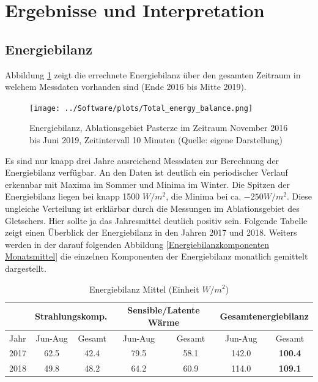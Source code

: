\documentclass[11pt,a4paper]{article}
\begin{document}
\pagebreak
\section{Ergebnisse und Interpretation}
\subsection{Energiebilanz}
Abbildung \ref{fig:Energiebilanz gesamter Messzeitraum, Zeitintervall 10 Minuten} zeigt die errechnete Energiebilanz über den gesamten Zeitraum in welchem Messdaten vorhanden sind (Ende 2016 bis Mitte 2019). 

\begin{figure}[H]
\centering
\texttt{[image: ../Software/plots/Total\_energy\_balance.png]}
\caption[Energiebilanz, Ablationsgebiet Pasterze im Zeitraum November 2016 bis Juni 2019, Zeitintervall 10 Minuten]{Energiebilanz, Ablationsgebiet Pasterze im Zeitraum November 2016 bis Juni 2019, Zeitintervall 10 Minuten (Quelle: eigene Darstellung)}
\label{fig:Energiebilanz gesamter Messzeitraum, Zeitintervall 10 Minuten}
\end{figure}

Es sind nur knapp drei Jahre ausreichend Messdaten zur Berechnung der Energiebilanz verfügbar. An den Daten ist deutlich ein periodischer Verlauf erkennbar mit Maxima im Sommer und Minima im Winter. Die Spitzen der Energiebilanz liegen bei knapp 1500 $W/m^2$, die Minima bei ca. $-250 W/m^2$. Diese ungleiche Verteilung ist erklärbar durch die Messungen im Ablationsgebiet des Gletschers. Hier sollte ja das Jahresmittel deutlich positiv sein. Folgende Tabelle zeigt einen Überblick der Energiebilanz in den Jahren 2017 und 2018. Weiters werden in der darauf folgenden Abbildung \ref{Energiebilanzkomponenten Monatsmittel} die einzelnen Komponenten der Energiebilanz monatlich gemittelt dargestellt.

\begin{table}[H]
\centering
{} 
\caption{Energiebilanz Mittel (Einheit $W/m^2$)}
\label{tab:Energiebilanz Mittel}
\begin{tabular}{|l|cc|cc|cc|}
\hline
     & \multicolumn{2}{c|}{\textbf{Strahlungskomp}.} & \multicolumn{2}{c|}{\textbf{Sensible/Latente Wärme}} & \multicolumn{2}{c|}{\textbf{Gesamtenergiebilanz}} \\ \hline
Jahr & Jun-Aug           & Gesamt           & Jun-Aug               & Gesamt              & Jun-Aug         & Gesamt                 \\ \hline
2017 & 62.5              & 42.4             & 79.5                  & 58.1                & 142.0           & \textbf{100.4}         \\ \hline
2018 & 49.8              & 48.2             & 64.2                  & 60.9                & 114.0           & \textbf{109.1}         \\ \hline
\end{tabular}
\end{table}
\end{document}
